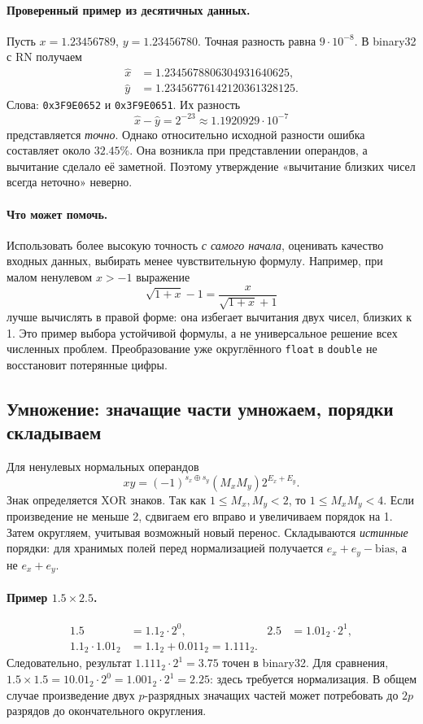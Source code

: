 \paragraph{Проверенный пример из десятичных данных.}
Пусть $x=1.23456789$, $y=1.23456780$. Точная разность равна $9\cdot10^{-8}$.
В binary32 с RN получаем
\[
\begin{aligned}
\hat x &= 1.2345678806304931640625,\\
\hat y &= 1.23456776142120361328125.
\end{aligned}
\]
Слова: \texttt{0x3F9E0652} и \texttt{0x3F9E0651}. Их разность
\[
\hat x-\hat y=2^{-23}\approx1.1920929\cdot10^{-7}
\]
представляется \emph{точно}. Однако относительно исходной разности
ошибка составляет около $32.45\%$. Она возникла при представлении
операндов, а вычитание сделало её заметной. Поэтому утверждение
«вычитание близких чисел всегда неточно» неверно.

\paragraph{Что может помочь.}
Использовать более высокую точность \emph{с самого начала}, оценивать
качество входных данных, выбирать менее чувствительную формулу.
Например, при малом ненулевом $x>-1$ выражение
\[
\sqrt{1+x}-1=\frac{x}{\sqrt{1+x}+1}
\]
лучше вычислять в правой форме: она избегает вычитания двух чисел,
близких к 1. Это пример выбора устойчивой формулы, а не универсальное
решение всех численных проблем. Преобразование уже округлённого
\texttt{float} в \texttt{double} не восстановит потерянные цифры.

\subsection{Умножение: значащие части умножаем, порядки складываем}
Для ненулевых нормальных операндов
\[
xy=(-1)^{s_x\oplus s_y}(M_xM_y)2^{E_x+E_y}.
\]
Знак определяется XOR знаков. Так как $1\le M_x,M_y<2$,
то $1\le M_xM_y<4$. Если произведение не меньше 2, сдвигаем его
вправо и увеличиваем порядок на 1. Затем округляем, учитывая
возможный новый перенос. Складываются \emph{истинные} порядки:
для хранимых полей перед нормализацией получается
$e_x+e_y-\mathrm{bias}$, а не $e_x+e_y$.

\paragraph{Пример $1.5\times2.5$.}
\[
\begin{aligned}
1.5 &= 1.1_2\cdot2^0,& 2.5 &= 1.01_2\cdot2^1,\\
1.1_2\cdot1.01_2 &=1.1_2+0.011_2=1.111_2.
\end{aligned}
\]
Следовательно, результат $1.111_2\cdot2^1=3.75$ точен в binary32.
Для сравнения, $1.5\times1.5=10.01_2\cdot2^0=1.001_2\cdot2^1=2.25$:
здесь требуется нормализация. В общем случае произведение двух
$p$-разрядных значащих частей может потребовать до $2p$ разрядов
до окончательного округления.

